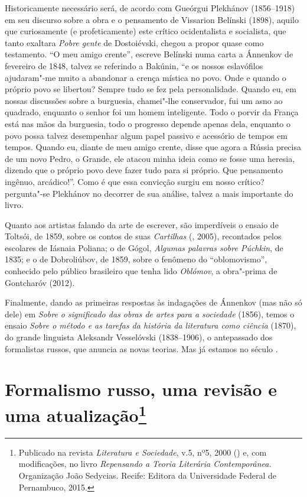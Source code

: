 {Historicamente necessário será, de acordo com Gueórgui Plekhánov (1856--1918) em seu
discurso sobre a obra e o pensamento de Vissarion Belínski (1898), 
aquilo que curiosamente (e
profeticamente) este crítico ocidentalista e socialista, que tanto
exaltara \emph{Pobre gente} de Dostoiévski, chegou a propor quase como
testamento. ``O meu amigo crente'', escreve Belínski numa carta a
Ánnenkov de fevereiro de 1848, talvez se referindo a Bakúnin, ``e os
nossos eslavófilos ajudaram"-me muito a abandonar a crença mística no
povo. Onde e quando o próprio povo se libertou? Sempre tudo se fez pela
personalidade. Quando eu, em nossas discussões sobre a burguesia,
chamei"-lhe conservador, fui um asno ao quadrado, enquanto o senhor foi
um homem inteligente. Todo o porvir da França está nas mãos da
burguesia, todo o progresso depende apenas dela, enquanto o povo possa
talvez desempenhar algum papel passivo e acessório de tempos em tempos.
Quando eu, diante de meu amigo crente, disse que agora a Rússia precisa
de um novo Pedro, o Grande, ele atacou minha ideia como se fosse uma
heresia, dizendo que o próprio povo deve fazer tudo para si próprio. Que
pensamento ingênuo, arcádico!''. Como é que essa convicção surgiu em
nosso crítico? pergunta"-se Plekhánov no decorrer de sua
análise, talvez a mais importante do livro.

Quanto aos artistas falando da arte de escrever, são imperdíveis o
ensaio de Toltsói, de 1859, sobre os contos de suas \emph{Cartilhas} (, 2005), recontados pelos escolares de Iásnaia Poliana; o
de Gógol, \emph{Algumas palavras sobre Púchkin}, de 1835; e o de Dobroliúbov,
de 1859, sobre o fenômeno do ``oblomovismo'', conhecido pelo público
brasileiro que tenha lido \emph{Oblómov}, a obra"-prima de Gontcharóv
(2012).

Finalmente, dando as primeiras respostas às indagações de Ánnenkov (mas
não só dele) em \emph{Sobre o significado das obras de artes para a sociedade}
(1856), temos o ensaio \emph{Sobre o método e as tarefas da história da
literatura como ciência} (1870), do grande linguista Aleksandr
Vesselóvski (1838--1906), o antepassado dos formalistas russos, que anuncia as novas
teorias. Mas já estamos no século .

\chapter{Formalismo russo, uma revisão e uma atualização\footnote{Publicado na revista \emph{Literatura e Sociedade}, v.5, nº5, 2000 () e, com modificações, no livro \emph{Repensando a Teoria Literária Contemporânea.} Organização João Sedycias. Recife: Editora da Universidade Federal de Pernambuco, 2015.}}

}
